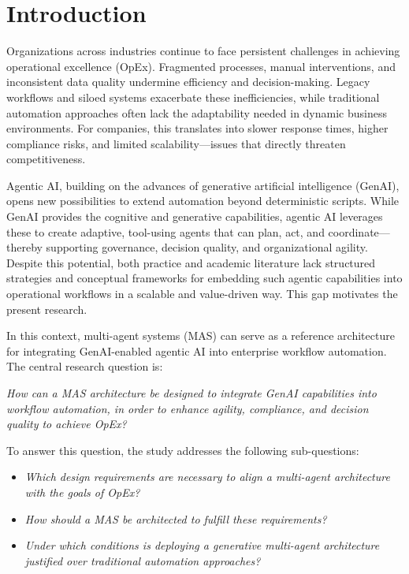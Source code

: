 \section{Introduction}\label{sec:intro} %
Organizations across industries continue to face persistent challenges in achieving operational excellence (OpEx). Fragmented processes, manual interventions, and inconsistent data quality undermine efficiency and decision-making. Legacy workflows and siloed systems exacerbate these inefficiencies, while traditional automation approaches often lack the adaptability needed in dynamic business environments. For companies, this translates into slower response times, higher compliance risks, and limited scalability—issues that directly threaten competitiveness.

Agentic AI, building on the advances of generative artificial intelligence (GenAI), opens new possibilities to extend automation beyond deterministic scripts. While GenAI provides the cognitive and generative capabilities, agentic AI leverages these to create adaptive, tool-using agents that can plan, act, and coordinate---thereby supporting governance, decision quality, and organizational agility. Despite this potential, both practice and academic literature lack structured strategies and conceptual frameworks for embedding such agentic capabilities into operational workflows in a scalable and value-driven way. This gap motivates the present research.

In this context, multi-agent systems (MAS) can serve as a reference architecture for integrating GenAI-enabled agentic AI into enterprise workflow automation. The central research question is:

\vspace{0.5\baselineskip}
\emph{How can a MAS architecture be designed to integrate GenAI capabilities into workflow automation, in order to enhance agility, compliance, and decision quality to achieve OpEx?}
\vspace{0.5\baselineskip}

To answer this question, the study addresses the following sub-questions:
\begin{itemize}
    \item \emph{Which design requirements are necessary to align a multi-agent architecture with the goals of OpEx?}
    \item \emph{How should a MAS be architected to fulfill these requirements?}
    \item \emph{Under which conditions is deploying a generative multi-agent architecture justified over traditional automation approaches?}
\end{itemize}


